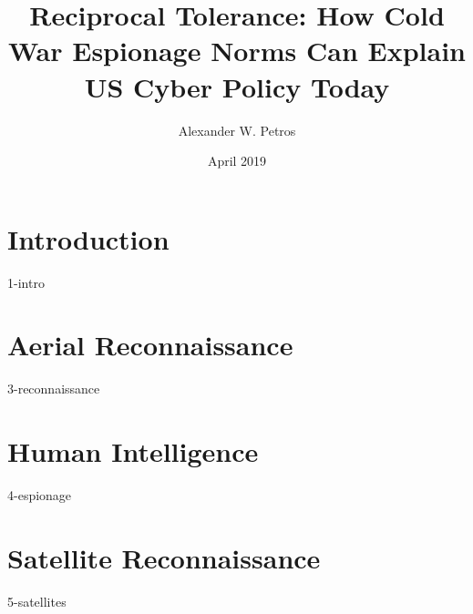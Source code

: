 \documentclass{report}
\title{Reciprocal Tolerance: How Cold War Espionage Norms Can Explain US Cyber Policy Today}
\author{Alexander W. Petros}
\date{April 2019}
\begin{document}
    \maketitle
    \tableofcontents
    \newpage

    \chapter{Introduction}
    {1-intro}

    \chapter{Aerial Reconnaissance}
    {3-reconnaissance}

    \chapter{Human Intelligence}
    {4-espionage}

    \chapter{Satellite Reconnaissance}
    {5-satellites}
\end{document}
